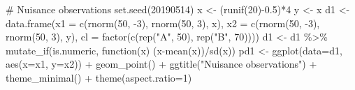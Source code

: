 \documentclass[
  letterpaper,
]{book}
\newenvironment{Shaded}{\begin{snugshade}}{\end{snugshade}}
\newcommand{\AttributeTok}[1]{\textcolor[rgb]{0.40,0.45,0.13}{#1}}
\newcommand{\CommentTok}[1]{\textcolor[rgb]{0.37,0.37,0.37}{#1}}
\newcommand{\ControlFlowTok}[1]{\textcolor[rgb]{0.00,0.23,0.31}{#1}}
\newcommand{\DecValTok}[1]{\textcolor[rgb]{0.68,0.00,0.00}{#1}}
\newcommand{\FloatTok}[1]{\textcolor[rgb]{0.68,0.00,0.00}{#1}}
\newcommand{\FunctionTok}[1]{\textcolor[rgb]{0.28,0.35,0.67}{#1}}
\newcommand{\NormalTok}[1]{\textcolor[rgb]{0.00,0.23,0.31}{#1}}
\newcommand{\OtherTok}[1]{\textcolor[rgb]{0.00,0.23,0.31}{#1}}
\newcommand{\SpecialCharTok}[1]{\textcolor[rgb]{0.37,0.37,0.37}{#1}}
\newcommand{\StringTok}[1]{\textcolor[rgb]{0.13,0.47,0.30}{#1}}
\begin{document}
\begin{Shaded}
\begin{Highlighting}[]
\CommentTok{\# Nuisance observations}
\FunctionTok{set.seed}\NormalTok{(}\DecValTok{20190514}\NormalTok{)}
\NormalTok{x }\OtherTok{\textless{}{-}}\NormalTok{ (}\FunctionTok{runif}\NormalTok{(}\DecValTok{20}\NormalTok{)}\SpecialCharTok{{-}}\FloatTok{0.5}\NormalTok{)}\SpecialCharTok{*}\DecValTok{4}
\NormalTok{y }\OtherTok{\textless{}{-}}\NormalTok{ x}
\NormalTok{d1 }\OtherTok{\textless{}{-}} \FunctionTok{data.frame}\NormalTok{(}\AttributeTok{x1 =} \FunctionTok{c}\NormalTok{(}\FunctionTok{rnorm}\NormalTok{(}\DecValTok{50}\NormalTok{, }\SpecialCharTok{{-}}\DecValTok{3}\NormalTok{), }
                            \FunctionTok{rnorm}\NormalTok{(}\DecValTok{50}\NormalTok{, }\DecValTok{3}\NormalTok{), x),}
                 \AttributeTok{x2 =} \FunctionTok{c}\NormalTok{(}\FunctionTok{rnorm}\NormalTok{(}\DecValTok{50}\NormalTok{, }\SpecialCharTok{{-}}\DecValTok{3}\NormalTok{), }
                            \FunctionTok{rnorm}\NormalTok{(}\DecValTok{50}\NormalTok{, }\DecValTok{3}\NormalTok{), y),}
                 \AttributeTok{cl =} \FunctionTok{factor}\NormalTok{(}\FunctionTok{c}\NormalTok{(}\FunctionTok{rep}\NormalTok{(}\StringTok{"A"}\NormalTok{, }\DecValTok{50}\NormalTok{), }
                             \FunctionTok{rep}\NormalTok{(}\StringTok{"B"}\NormalTok{, }\DecValTok{70}\NormalTok{))))}
\NormalTok{d1 }\OtherTok{\textless{}{-}}\NormalTok{ d1 }\SpecialCharTok{\%\textgreater{}\%} 
  \FunctionTok{mutate\_if}\NormalTok{(is.numeric, }\ControlFlowTok{function}\NormalTok{(x) (x}\SpecialCharTok{{-}}\FunctionTok{mean}\NormalTok{(x))}\SpecialCharTok{/}\FunctionTok{sd}\NormalTok{(x))}
\NormalTok{pd1 }\OtherTok{\textless{}{-}} \FunctionTok{ggplot}\NormalTok{(}\AttributeTok{data=}\NormalTok{d1, }\FunctionTok{aes}\NormalTok{(}\AttributeTok{x=}\NormalTok{x1, }\AttributeTok{y=}\NormalTok{x2)) }\SpecialCharTok{+} 
  \FunctionTok{geom\_point}\NormalTok{() }\SpecialCharTok{+}
    \FunctionTok{ggtitle}\NormalTok{(}\StringTok{"Nuisance observations"}\NormalTok{) }\SpecialCharTok{+} 
  \FunctionTok{theme\_minimal}\NormalTok{() }\SpecialCharTok{+}
    \FunctionTok{theme}\NormalTok{(}\AttributeTok{aspect.ratio=}\DecValTok{1}\NormalTok{) }


\end{Highlighting}
\end{Shaded}
\end{document}
